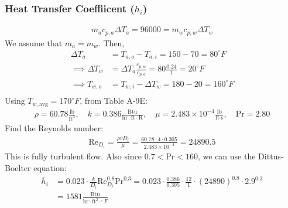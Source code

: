 \subsubsection{Heat Transfer Coeffiicent ($h_i$)}
\begin{align*}
    m_a c_{p, a} \Delta T_a = 96000 = m_w c_{p, w} \Delta T_w
\end{align*}
We assume that $m_a = m_w$. Then,
\begin{align*}
    \Delta T_a          & = T_{a, o} - T_{a, i} = 150 - 70 = 80^\circ F                           \\
    \implies \Delta T_w & = \Delta T_a \frac{c_{p, w}}{c_{p, a}} = 80 \frac{0.24}{1} = 20^\circ F \\
    \implies T_{w, o}   & = T_{w, i} - \Delta T_w = 180 - 20 = 160^\circ F                        \\
\end{align*}
Using $T_{w, \text{avg}} = 170^\circ F$, from Table A-9E:
\begin{align*}
    \rho = 60.78 \frac{\text{lb}}{\text{ft}^3}, \quad k = 0.386 \frac{\text{Btu}}{\text{hr} \cdot \text{ft} \cdot \text{R}}, \quad \mu = 2.483 \times 10^{-4} \frac{\text{lb}}{\text{ft} \cdot \text{s}}, \quad \text{Pr} = 2.80
\end{align*}
Find the Reynolds number:
\begin{align*}
    \text{Re}_{D_i} = \frac{\rho \bar{v} D_i}{\mu} = \frac{60.78 \cdot 4 \cdot 0.305}{2.483 \times 10^{-4}} = 24890.5
\end{align*}
This is fully turbulent flow. Also since $0.7 < \text{Pr} < 160$, we can use the Dittus-Boelter equation:
\begin{align*}
    \bar{h}_{i} & = 0.023 \cdot \frac{k}{D_i} \text{Re}_{D_i}^{0.8} \text{Pr}^{0.3} = 0.023 \cdot \frac{0.386}{0.305} \cdot \frac{12}{1} \cdot (24890)^{0.8} \cdot 2.9^{0.3} \\
                & = 1581 \frac{\text{Btu}}{\text{hr} \cdot \text{ft}^2 \cdot ^\circ F}
\end{align*}
